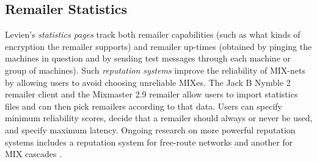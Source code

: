 \documentclass[11pt]{IEEEtran}
\begin{document}
%
%

\subsection{Remailer Statistics}

Levien's \emph{statistics pages} \cite{levien} track both remailer
capabilities (such as what kinds of encryption the remailer supports)
and remailer up-times (obtained by pinging the machines in question
and by sending test messages through each machine or group of
machines).  Such \emph{reputation systems} improve the reliability of
MIX-nets by allowing users to avoid choosing unreliable MIXes. The
Jack B Nymble 2 remailer client \cite{potato} and the Mixmaster 2.9
remailer allow users to import statistics files and can then pick
remailers according to that data. Users can specify minimum
reliability scores, decide that a remailer should always or never be
used, and specify maximum latency. Ongoing research on more powerful
reputation systems includes a reputation system for free-route
networks \cite{mix-acc} and another for MIX cascades \cite{casc-rep}.

\end{document}
